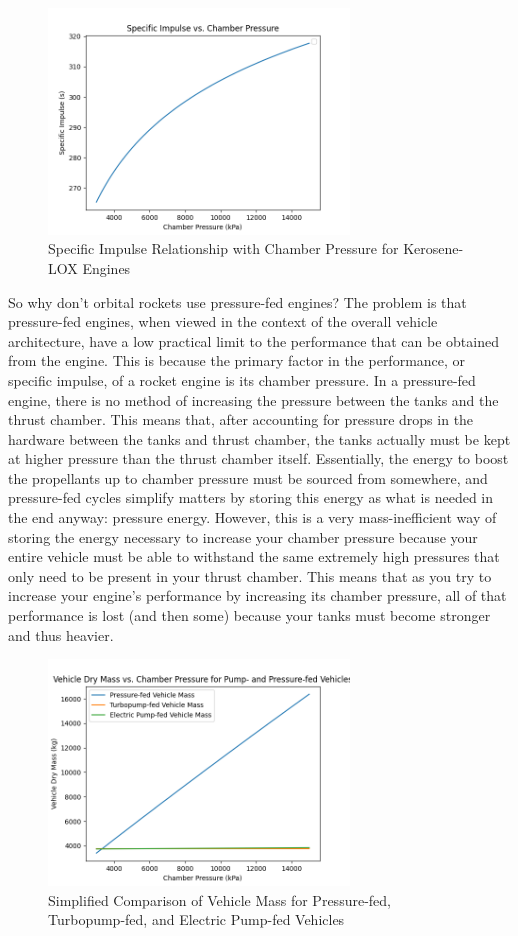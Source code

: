 \documentclass[12pt, letterpaper]{article}
\begin{document}
\newpage

\begin{figure}[!t]
    \centering
    \includegraphics[width=8cm]{Pc_V_Isp.png}
    \caption{Specific Impulse Relationship with Chamber Pressure for Kerosene-LOX Engines}
\end{figure}

So why don't orbital rockets use pressure-fed engines? The problem is that pressure-fed engines, when viewed in the context of the overall vehicle architecture, have a low practical limit to the performance that can be obtained from the engine. This is because the primary factor in the performance, or specific impulse, of a rocket engine is its chamber pressure. In a pressure-fed engine, there is no method of increasing the pressure between the tanks and the thrust chamber. This means that, after accounting for pressure drops in the hardware between the tanks and thrust chamber, the tanks actually must be kept at higher pressure than the thrust chamber itself. Essentially, the energy to boost the propellants up to chamber pressure must be sourced from somewhere, and pressure-fed cycles simplify matters by storing this energy as what is needed in the end anyway: pressure energy. However, this is a very mass-inefficient way of storing the energy necessary to increase your chamber pressure because your entire vehicle must be able to withstand the same extremely high pressures that only need to be present in your thrust chamber. This means that as you try to increase your engine's performance by increasing its chamber pressure, all of that performance is lost (and then some) because your tanks must become stronger and thus heavier. 

\begin{figure}[!b]
    \centering
    \includegraphics[width=8cm]{VehicleMass_V_Pc.png}
    \caption{Simplified Comparison of Vehicle Mass for Pressure-fed, Turbopump-fed, and Electric Pump-fed Vehicles}
\end{figure}
\end{document}
